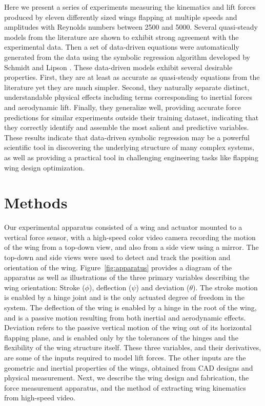 \documentclass{article}
\begin{document}
Here we present a series of experiments measuring the kinematics and lift forces
produced by eleven differently sized wings flapping at multiple speeds and
amplitudes with Reynolds numbers between 2500 and 5000. Several quasi-steady
models from the literature are shown to exhibit strong agreement with the
experimental data. Then a set of data-driven equations were automatically
generated from the data using the symbolic regression algorithm developed by
Schmidt and Lipson \cite{schmidt2009distilling}. These data-driven models
exhibit several desirable properties. First, they are at least as accurate as
quasi-steady equations from the literature yet they are much simpler.  Second,
they naturally separate distinct, understandable physical effects including
terms corresponding to inertial forces and aerodynamic lift. Finally, they
generalize well, providing accurate force predictions for similar experiments
outside their training dataset, indicating that they correctly identify and
assemble the most salient and predictive variables. These results indicate that
data-driven symbolic regression may be a powerful scientific tool in discovering
the underlying structure of many complex systems, as well as providing a
practical tool in challenging engineering tasks like flapping wing design
optimization.

\section*{Methods}
Our experimental apparatus consisted of a wing and actuator mounted to a
vertical force sensor, with a high-speed color video camera recording the motion
of the wing from a top-down view, and also from a side view using a mirror. The
top-down and side views were used to detect and track the position and
orientation of the wing.  Figure~\ref{fig:apparatus} provides a diagram of the
apparatus as well as illustrations of the three primary variables describing the
wing orientation: Stroke ($\phi$), deflection ($\psi$) and deviation ($\theta$).
The stroke motion is enabled by a hinge joint and is the only actuated degree of
freedom in the system. The deflection of the wing is enabled by a hinge in the
root of the wing, and is a passive motion resulting from both inertial and
aerodynamic effects. Deviation refers to the passive vertical motion of the wing
out of its horizontal flapping plane, and is enabled only by the tolerances of
the hinges and the flexibility of the wing structure itself. These three
variables, and their derivatives, are some of the inputs required to model lift
forces. The other inputs are the geometric and inertial properties of the wings,
obtained from CAD designs and physical measurement. Next, we describe the wing
design and fabrication, the force measurement apparatus, and the method of
extracting wing kinematics from high-speed video.
\end{document}
